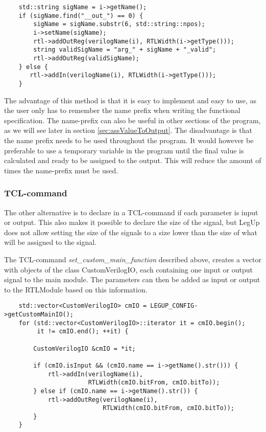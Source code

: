 \begin{verbatim}
    std::string sigName = i->getName();
    if (sigName.find("__out_") == 0) {
        sigName = sigName.substr(6, std::string::npos);
        i->setName(sigName);
        rtl->addOutReg(verilogName(i), RTLWidth(i->getType()));
        string validSigName = "arg_" + sigName + "_valid";
        rtl->addOutReg(validSigName);
    } else {
       rtl->addIn(verilogName(i), RTLWidth(i->getType())); 
    }
\end{verbatim}
The advantage of this method is that it is easy to implement and easy to use, as the user only has to remember the name prefix when writing the functional specification. The name-prefix can also be useful in other sections of the program, as we will see later in section \ref{sec:assValueToOutput}. The disadvantage is that the name prefix needs to be used throughout the program. It would however be preferable to use a temporary variable in the program until the final value is calculated and ready to be assigned to the output. This will reduce the amount of times the name-prefix must be used.
\subsubsection{TCL-command}
The other alternative is to declare in a TCL-command if each parameter is input or output. This also makes it possible to declare the size of the signal, but LegUp does not allow setting the size of the signals to a size lower than the size of what will be assigned to the signal.

The TCL-command \textit{set\_custom\_main\_function} described above, creates a vector with objects of the class CustomVerilogIO, each containing one input or output signal to the main module. The parameters can then be added as input or output to the RTLModule based on this information.
\begin{verbatim}
    std::vector<CustomVerilogIO> cmIO = LEGUP_CONFIG->getCustomMainIO();
    for (std::vector<CustomVerilogIO>::iterator it = cmIO.begin();
         it != cmIO.end(); ++it) {

        CustomVerilogIO &cmIO = *it;

        if (cmIO.isInput && (cmIO.name == i->getName().str())) {
            rtl->addIn(verilogName(i),
                       RTLWidth(cmIO.bitFrom, cmIO.bitTo));
        } else if (cmIO.name == i->getName().str()) {
            rtl->addOutReg(verilogName(i),
                           RTLWidth(cmIO.bitFrom, cmIO.bitTo));
        }
    }
\end{verbatim}

